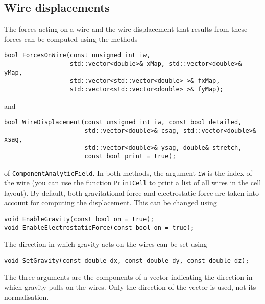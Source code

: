 \subsection{Wire displacements}
The forces acting on a wire and the wire displacement that results from 
these forces can be computed using the methods
\begin{lstlisting}
bool ForcesOnWire(const unsigned int iw, 
                  std::vector<double>& xMap, std::vector<double>& yMap,
                  std::vector<std::vector<double> >& fxMap,
                  std::vector<std::vector<double> >& fyMap);
\end{lstlisting}
and
\begin{lstlisting}
bool WireDisplacement(const unsigned int iw, const bool detailed,
                      std::vector<double>& csag, std::vector<double>& xsag,
                      std::vector<double>& ysag, double& stretch,
                      const bool print = true);
\end{lstlisting}
of \texttt{ComponentAnalyticField}. In both methods, the argument 
\texttt{iw} is the index of the wire (you can use the function \texttt{PrintCell} to print a list of all wires in the cell layout).
By default, both gravitational force and electrostatic force are 
taken into account for computing the displacement. 
This can be changed using
\begin{lstlisting}
void EnableGravity(const bool on = true);
void EnableElectrostaticForce(const bool on = true);
\end{lstlisting}
The direction in which gravity acts on the wires can be set using
\begin{lstlisting}
void SetGravity(const double dx, const double dy, const double dz);
\end{lstlisting}
The three arguments are the components of a vector indicating the 
direction in which gravity pulls on the wires. 
Only the direction of the vector is used, not its normalisation. 


